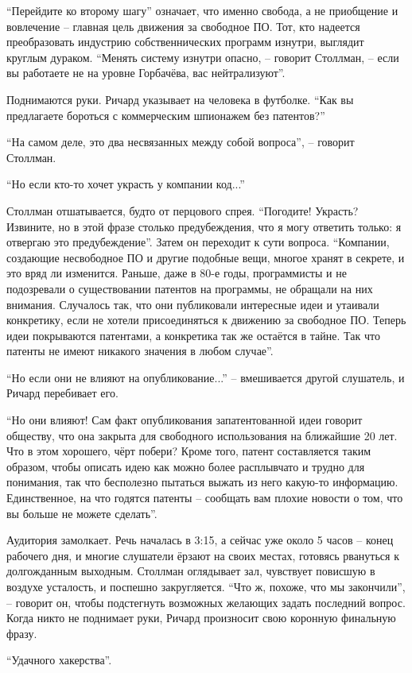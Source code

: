 \enquote{Перейдите ко второму шагу} означает, что именно свобода, а не приобщение и вовлечение -- главная цель движения за свободное ПО. Тот, кто надеется преобразовать индустрию собственнических программ изнутри, выглядит круглым дураком. \enquote{Менять систему изнутри опасно, -- говорит Столлман, -- если вы работаете не на уровне Горбачёва, вас нейтрализуют}.

Поднимаются руки. Ричард указывает на человека в футболке. \enquote{Как вы предлагаете бороться с коммерческим шпионажем без патентов?}

\enquote{На самом деле, это два несвязанных между собой вопроса}, -- говорит Столлман.

\enquote{Но если кто-то хочет украсть у компании код...}

Столлман отшатывается, будто от перцового спрея. \enquote{Погодите! Украсть? Извините, но в этой фразе столько предубеждения, что я могу ответить только: я отвергаю это предубеждение}. Затем он переходит к сути вопроса. \enquote{Компании, создающие несвободное ПО и другие подобные вещи, многое хранят в секрете, и это вряд ли изменится. Раньше, даже в 80-е годы, программисты и не подозревали о существовании патентов на программы, не обращали на них внимания. Случалось так, что они публиковали интересные идеи и утаивали конкретику, если не хотели присоединяться к движению за свободное ПО. Теперь идеи покрываются патентами, а конкретика так же остаётся в тайне. Так что патенты не имеют никакого значения в любом случае}.

\enquote{Но если они не влияют на опубликование...} -- вмешивается другой слушатель, и Ричард перебивает его.

\enquote{Но они влияют! Сам факт опубликования запатентованной идеи говорит обществу, что она закрыта для свободного использования на ближайшие 20 лет. Что в этом хорошего, чёрт побери? Кроме того, патент составляется таким образом, чтобы описать идею как можно более расплывчато и трудно для понимания, так что бесполезно пытаться выжать из него какую-то информацию. Единственное, на что годятся патенты -- сообщать вам плохие новости о том, что вы больше не можете сделать}.

Аудитория замолкает. Речь началась в 3:15, а сейчас уже около 5 часов -- конец рабочего дня, и многие слушатели ёрзают на своих местах, готовясь рвануться к долгожданным выходным. Столлман оглядывает зал, чувствует повисшую в воздухе усталость, и поспешно закругляется. \enquote{Что ж, похоже, что мы закончили}, -- говорит он, чтобы подстегнуть возможных желающих задать последний вопрос. Когда никто не поднимает руки, Ричард произносит свою коронную финальную фразу.

\enquote{Удачного хакерства}.

\theendnotes
\setcounter{endnote}{0}

